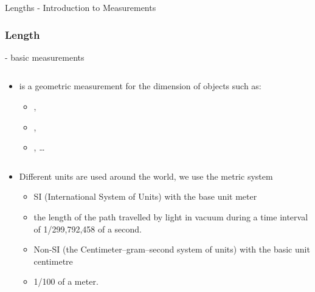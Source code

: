 \begin{omgroup}{Lengths - Introduction to Measurements}
\begin{frame}
  \frametitle{Length}
  \begin{module}[id=length]
  - basic measurements\\
  \begin{columns}
    \begin{column}{5.8cm}
      \begin{itemize}
      \item
      \begin{definition}
         is a geometric measurement for the dimension of objects such as:
        \begin{itemize}
        \item {},
        \item {},
        \item {}, \ldots
        \end{itemize}
      \end{definition}
    \end{itemize}
    \end{column}
    \begin{column}{5.5cm}
    \end{column}
  \end{columns}
\begin{itemize}
\item Different units are used around the world, we use the metric system
  	\begin{itemize}
  	\item SI (International System of Units) with the base unit meter
  	\item 	\begin{definition}
		  		 the length of the path travelled by light in vacuum during a time interval of 1/299,792,458 of a second.
			\end{definition}
  	\item Non-SI (the Centimeter–gram–second system of units) with the basic unit centimetre
  	\item 	\begin{definition}
			   1/100 of a meter.
			\end{definition}
	\end{itemize}
\end{itemize}
\end{module}
\end{frame}
\end{omgroup}

